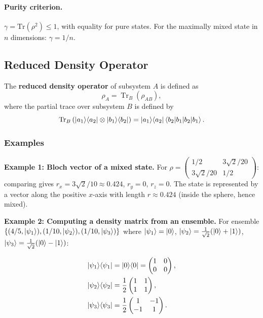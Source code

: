 \documentclass[10pt,a4paper]{article}
\begin{document}
\paragraph{Purity criterion.} $\gamma=\mathrm{Tr}(\rho^2)\le 1$, with equality for pure states. For the maximally mixed state in $n$ dimensions: $\gamma=1/n$.

\subsection{Reduced Density Operator}

\begin{tcolorbox}[defstyle, title={Definition}]
The \textbf{reduced density operator} of subsystem \(A\) is defined as
\[
\rho_A=\operatorname{Tr}_B(\rho_{AB}),
\]
where the partial trace over subsystem \(B\) is defined by
\[
\operatorname{Tr}_B
\left(
\ket{a_1}\!\bra{a_2}\otimes\ket{b_1}\!\bra{b_2}
\right)
=
\ket{a_1}\!\bra{a_2}\braket{b_2|b_1}.
\]
\end{tcolorbox}

\subsubsection*{Examples}

\textbf{Example 1: Bloch vector of a mixed state.}
For $\rho=\begin{pmatrix}1/2 & 3\sqrt{2}/20\\3\sqrt{2}/20 & 1/2\end{pmatrix}$: comparing gives $r_x=3\sqrt{2}/10\approx 0.424$, $r_y=0$, $r_z=0$. The state is represented by a vector along the positive $x$-axis with length $r\approx 0.424$ (inside the sphere, hence mixed).

\textbf{Example 2: Computing a density matrix from an ensemble.}
For ensemble $\{(4/5,\ket{\psi_1}),(1/10,\ket{\psi_2}),(1/10,\ket{\psi_3})\}$ where $\ket{\psi_1}=\ket{0}$, $\ket{\psi_2}=\frac{1}{\sqrt{2}}(\ket{0}+\ket{1})$, $\ket{\psi_3}=\frac{1}{\sqrt{2}}(\ket{0}-\ket{1})$:

\begin{align*}
\ket{\psi_1}\!\bra{\psi_1}&=\ket{0}\!\bra{0}=\begin{pmatrix}1&0\\0&0\end{pmatrix},\\
\ket{\psi_2}\!\bra{\psi_2}&=\frac{1}{2}\begin{pmatrix}1&1\\1&1\end{pmatrix},\\
\ket{\psi_3}\!\bra{\psi_3}&=\frac{1}{2}\begin{pmatrix}1&-1\\-1&1\end{pmatrix}.
\end{align*}
\end{document}
